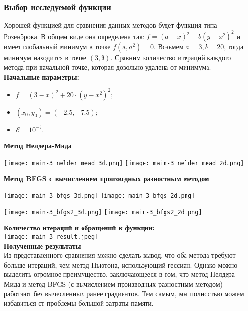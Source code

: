 \documentclass{article}
\begin{document}
\subsubsection*{Выбор исследуемой функции}
Хорошей функцией для сравнения данных методов будет функция типа Розенброка. В общем виде она определена так: $f = (a - x)^2 + b(y - x^2)^2$ и имеет глобальный минимум в точке $f(a, a^2) = 0$. Возьмем $a = 3, b = 20$, тогда минимум находится в точке $(3, 9)$. Сравним количество итераций каждого метода при начальной точке, которая довольно удалена от минимума. \\

\noindent \textbf{Начальные параметры:}
\begin{itemize}
    \item $f = (3 - x)^2 + 20 \cdot (y - x^2)^2$;
    \item $(x_0, y_0) = (-2.5, -7.5)$;
    \item $\mathcal{E} = 10^{-7}$.
\end{itemize}

\noindent \textbf{Метод Нелдера-Мида}
\begin{center}
    \texttt{[image: main-3\_nelder\_mead\_3d.png]}
    \texttt{[image: main-3\_nelder\_mead\_2d.png]}
    \label{fig:enter-label}
\end{center}

\newpage
\noindent \textbf{Метод BFGS с вычислением производных разностным методом}
\begin{center}
    \texttt{[image: main-3\_bfgs\_3d.png]}
    \texttt{[image: main-3\_bfgs\_2d.png]}
    \label{fig:enter-label}
\end{center}

\begin{center}
    \texttt{[image: main-3\_bfgs2\_3d.png]}
    \texttt{[image: main-3\_bfgs2\_2d.png]}
    \label{fig:enter-label}
\end{center}

\noindent \textbf{Количество итераций и обращений к функции:} \\

\noindent \texttt{[image: main-3\_result.jpeg]} \\

\noindent \textbf{Полученные результаты} \\

\noindent Из представленного сравнения можно сделать вывод, что оба метода требуют больше итераций, чем метод Ньютона, использующий гессиан. Однако можно выделить огромное преимущество, заключающееся в том, что метод Нелдера-Мида и метод BFGS (с вычислением производных разностным методом) работают без вычесленных ранее градиентов. Тем самым, мы полностью можем избавиться от проблемы большой затраты памяти.
\end{document}
